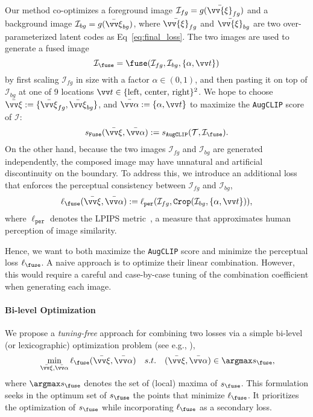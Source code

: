 \documentclass[10pt,twocolumn,letterpaper]{article}
\newcommand{\ourloss}{\texttt{AugCLIP}}
\begin{document}
Our method co-optimizes a 
foreground image $\mathcal{I}_{fg}=g(\bar {\vv{\xi}}_{fg})$ and a
background image $\mathcal{I}_{bg}=g(\bar{\vv\xi}_{bg})$,
where $\bar{\vv{\xi}}_{fg}$ and $\bar{\vv{\xi}}_{bg}$ are two over-parameterized latent codes as Eq~\ref{eq:final_loss}. 
The two images are used to generate a fused image 
$$\mathcal I_{\fuse}=\fuse(\mathcal I_{fg}, \mathcal I_{bg}, \{\alpha, \vv t\})$$ by first scaling $\mathcal I_{fg}$ in size with a factor $\alpha\in(0,1)$, and then pasting it on top of $\mathcal I_{bg}$ at one of 9 locations $\vv t \in\{\textrm{left, center, right}\}^2$. We hope to choose $\bar{\vv\xi}:=\{\bar{\vv \xi}_{fg},\bar{ \vv \xi}_{bg}\}$, and $\bar{\vv\alpha}:=\{\alpha, \vv t\}$
to maximize the {\ourloss} score of $\mathcal I$: 
$$
s_{\texttt{Fuse}}(\bar{\vv \xi},\bar {\vv\alpha })
:= s_{\ourloss}(\mathcal T,\mathcal I_\fuse). 
$$
On the other hand, 
because the two images $\mathcal{I}_{fg}$ and $\mathcal{I}_{bg}$ 
are generated independently,
the composed image may have unnatural and  artificial discontinuity on the boundary. To address this, we introduce an additional loss that enforces the perceptual consistency between $\mathcal{I}_{fg}$ and $\mathcal{I}_{bg}$,
$$
\ell_{\fuse}(\bar{\vv \xi}, \bar{\vv\alpha}): = \ell_{\texttt{per}}(\mathcal I_{fg}, \texttt{Crop}(\mathcal I_{bg}, \{\alpha, \vv t\})),
$$
where $\ell_{\texttt{per}}$ denotes the LPIPS metric~\cite{zhang2018unreasonable}, 
a measure 
that approximates human perception of image similarity. 





Hence, we want to both maximize  the {\ourloss} score and minimize the perceptual loss $\ell_{\fuse}$. 
A naive approach is to optimize their linear combination. 
However, this would require a careful and case-by-case tuning of the combination coefficient when generating each image. 


\paragraph{Bi-level Optimization}
We propose a  
\emph{tuning-free} approach for combining two losses via 
a simple bi-level (or lexicographic) optimization problem (see e.g., \cite{dempe2020bilevel,gong2021biobjective}), 
\begin{equation}
\label{eq:bilevel}
\begin{aligned}
    & \min_{\bar{\vv \xi}, \bar{\vv\alpha}} \ell_{\fuse}(\bar{\vv \xi}, \bar {\vv \alpha})
& s.t. ~~~ (\bar{\vv \xi}, \bar{\vv \alpha}) \in  
    \argmax  s_{\fuse},
\end{aligned}
\end{equation}
where   $\argmax  s_{\fuse}$ denotes the set of (local) maxima of $s_{\fuse}$. 
This formulation seeks in the optimum set of $s_{\fuse}$ the points that minimize $\ell_{\fuse}$. It prioritizes the optimization of $ s_{\fuse}$ while incorporating $\ell_{\fuse}$ as a secondary loss. 
\end{document}
